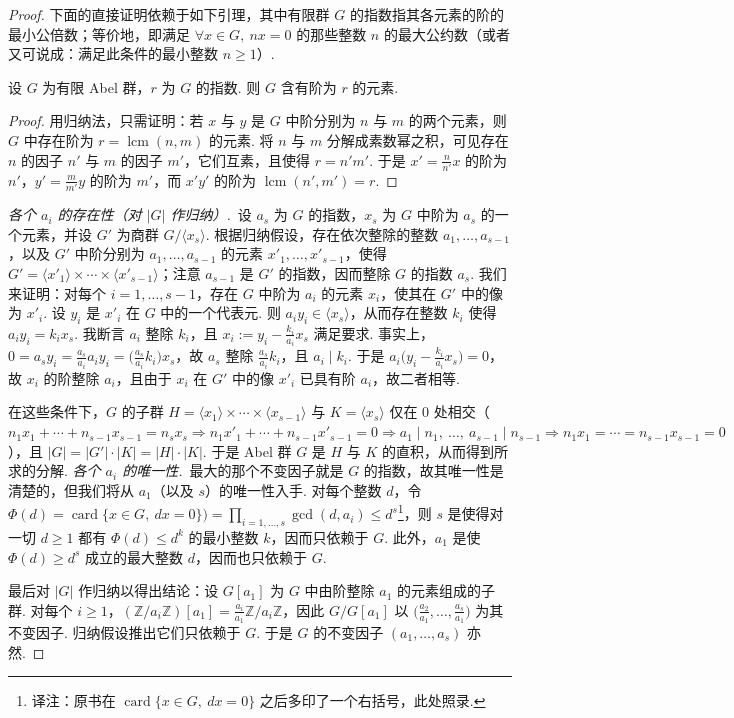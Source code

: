 \begin{proof}
下面的直接证明依赖于如下引理，其中有限群 $G$ 的指数指其各元素的阶的最小公倍数；等价地，即满足 $\forall x\in G,\ nx=0$ 的那些整数 $n$ 的最大公约数（或者又可说成：满足此条件的最小整数 $n\geqslant1$）.
\begin{lemma}\label{lemma:fg-1-3-2}
设 $G$ 为有限 Abel 群，$r$ 为 $G$ 的指数. 则 $G$ 含有阶为 $r$ 的元素.
\end{lemma}
\begin{proof}
用归纳法，只需证明：若 $x$ 与 $y$ 是 $G$ 中阶分别为 $n$ 与 $m$ 的两个元素，则 $G$ 中存在阶为 $r=\operatorname{lcm}(n,m)$ 的元素. 将 $n$ 与 $m$ 分解成素数幂之积，可见存在 $n$ 的因子 $n'$ 与 $m$ 的因子 $m'$，它们互素，且使得 $r=n'm'$. 于是 $x'=\frac{n}{n'}x$ 的阶为 $n'$，$y'=\frac{m}{m'}y$ 的阶为 $m'$，而 $x'y'$ 的阶为 $\operatorname{lcm}(n',m')=r$.
\end{proof}
\emph{各个 $a_i$ 的存在性（对 $|G|$ 作归纳）.}\ 设 $a_s$ 为 $G$ 的指数，$x_s$ 为 $G$ 中阶为 $a_s$ 的一个元素，并设 $G'$ 为商群 $G/\langle x_s\rangle$. 根据归纳假设，存在依次整除的整数 $a_1,\dots,a_{s-1}$，以及 $G'$ 中阶分别为 $a_1,\dots,a_{s-1}$ 的元素 $x'_1,\dots,x'_{s-1}$，使得 $G'=\langle x'_1\rangle\times\cdots\times\langle x'_{s-1}\rangle$；注意 $a_{s-1}$ 是 $G'$ 的指数，因而整除 $G$ 的指数 $a_s$. 我们来证明：对每个 $i=1,\dots,s-1$，存在 $G$ 中阶为 $a_i$ 的元素 $x_i$，使其在 $G'$ 中的像为 $x'_i$. 设 $y_i$ 是 $x'_i$ 在 $G$ 中的一个代表元. 则 $a_iy_i\in\langle x_s\rangle$，从而存在整数 $k_i$ 使得 $a_iy_i=k_ix_s$. 我断言 $a_i$ 整除 $k_i$，且 $x_i:=y_i-\frac{k_i}{a_i}x_s$ 满足要求. 事实上，$0=a_sy_i=\frac{a_s}{a_i}a_iy_i=\bigl(\frac{a_s}{a_i}k_i\bigr)x_s$，故 $a_s$ 整除 $\frac{a_s}{a_i}k_i$，且 $a_i\mid k_i$. 于是 $a_i\bigl(y_i-\frac{k_i}{a_i}x_s\bigr)=0$，故 $x_i$ 的阶整除 $a_i$，且由于 $x_i$ 在 $G'$ 中的像 $x'_i$ 已具有阶 $a_i$，故二者相等.

在这些条件下，$G$ 的子群 $H=\langle x_1\rangle\times\cdots\times\langle x_{s-1}\rangle$ 与 $K=\langle x_s\rangle$ 仅在 $0$ 处相交（$n_1x_1+\cdots+n_{s-1}x_{s-1}=n_sx_s\Rightarrow n_1x'_1+\cdots+n_{s-1}x'_{s-1}=0\Rightarrow a_1\mid n_1,\ \dots,\ a_{s-1}\mid n_{s-1}\Rightarrow n_1x_1=\cdots=n_{s-1}x_{s-1}=0$），且 $|G|=|G'|\cdot|K|=|H|\cdot|K|$. 于是 Abel 群 $G$ 是 $H$ 与 $K$ 的直积，从而得到所求的分解.
\emph{各个 $a_i$ 的唯一性.}\ 最大的那个不变因子就是 $G$ 的指数，故其唯一性是清楚的，但我们将从 $a_1$（以及 $s$）的唯一性入手. 对每个整数 $d$，令 $\Phi(d)=\operatorname{card}\{x\in G,\ dx=0\})=\prod_{i=1,\dots,s}\operatorname{gcd}(d,a_i)\leqslant d^s$\footnote{译注：原书在 $\operatorname{card}\{x\in G,\ dx=0\}$ 之后多印了一个右括号，此处照录.}，则 $s$ 是使得对一切 $d\geqslant1$ 都有 $\Phi(d)\leqslant d^k$ 的最小整数 $k$，因而只依赖于 $G$. 此外，$a_1$ 是使 $\Phi(d)\geqslant d^s$ 成立的最大整数 $d$，因而也只依赖于 $G$.

最后对 $|G|$ 作归纳以得出结论：设 $G[a_1]$ 为 $G$ 中由阶整除 $a_1$ 的元素组成的子群. 对每个 $i\geqslant1$，$(\mathbb{Z}/a_i\mathbb{Z})[a_1]=\frac{a_i}{a_1}\mathbb{Z}/a_i\mathbb{Z}$，因此 $G/G[a_1]$ 以 $\bigl(\frac{a_2}{a_1},\dots,\frac{a_s}{a_1}\bigr)$ 为其不变因子. 归纳假设推出它们只依赖于 $G$. 于是 $G$ 的不变因子 $(a_1,\dots,a_s)$ 亦然.
\end{proof}
